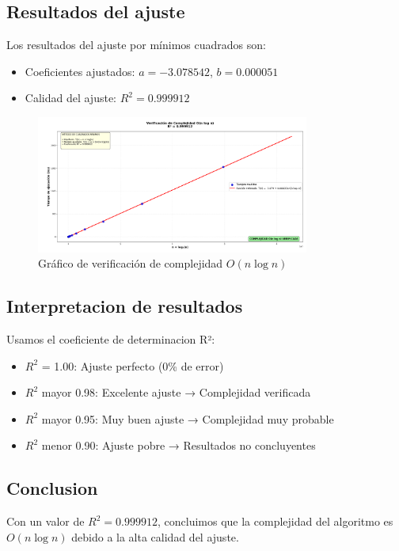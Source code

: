 \subsection{Resultados del ajuste}

Los resultados del ajuste por mínimos cuadrados son:

\begin{itemize}
    \item Coeficientes ajustados: $a = -3.078542$, $b = 0.000051$
    \item Calidad del ajuste: $R^2 = 0.999912$
    \end{itemize}

\begin{figure}[H]
    \centering
    \includegraphics[width=0.8\textwidth]{./img/Figure_1.png}
    \caption{Gráfico de verificación de complejidad $O(n \log n)$}
\end{figure}

\subsection{Interpretacion de resultados}

Usamos el coeficiente de determinacion R²:

\begin{itemize}
    \item $R^2$ = 1.00: Ajuste perfecto (0\% de error)
    \item $R^2$ mayor 0.98: Excelente ajuste → Complejidad verificada
    \item $R^2$ mayor 0.95: Muy buen ajuste → Complejidad muy probable
    \item $R^2$ menor 0.90: Ajuste pobre → Resultados no concluyentes
\end{itemize}

\subsection{Conclusion}

Con un valor de $R^2 = 0.999912$, concluimos que la complejidad del algoritmo es $O(n \log n)$ debido a la alta calidad del ajuste.